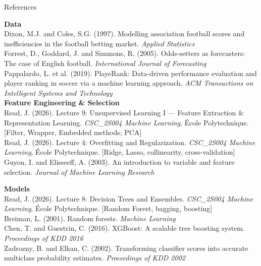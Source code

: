 \documentclass[aspectratio=169,12pt]{beamer}
\begin{document}
\begin{frame}[allowframebreaks]{References}
\tiny
\setlength{\parskip}{0.18em}

\textbf{Data}\\[0.15em]
Dixon, M.J. and Coles, S.G. (1997). Modelling association football scores and inefficiencies in the football betting market. \textit{Applied Statistics} \\
Forrest, D., Goddard, J. and Simmons, R. (2005). Odds-setters as forecasters: The case of English football. \textit{International Journal of Forecasting} \\
Pappalardo, L. et al. (2019). PlayeRank: Data-driven performance evaluation and player ranking in soccer via a machine learning approach. \textit{ACM Transactions on Intelligent Systems and Technology} \\

\vspace{3em}
\textbf{Feature Engineering \& Selection}\\[0.15em]
Read, J. (2026). Lecture 9: Unsupervised Learning I --- Feature Extraction \& Representation Learning. \textit{CSC\_2S004 Machine Learning}, École Polytechnique. [Filter, Wrapper, Embedded methods; PCA]\\
Read, J. (2026). Lecture 4: Overfitting and Regularization. \textit{CSC\_2S004 Machine Learning}, École Polytechnique. [Ridge, Lasso, collinearity, cross-validation]\\
Guyon, I. and Elisseeff, A. (2003). An introduction to variable and feature selection. \textit{Journal of Machine Learning Research}

\vspace{3em}
\textbf{Models}\\[0.15em]
Read, J. (2026). Lecture 8: Decision Trees and Ensembles. \textit{CSC\_2S004 Machine Learning}, École Polytechnique. [Random Forest, bagging, boosting]\\
Breiman, L. (2001). Random forests. \textit{Machine Learning} \\
Chen, T. and Guestrin, C. (2016). XGBoost: A scalable tree boosting system. \textit{Proceedings of KDD 2016} \\
Zadrozny, B. and Elkan, C. (2002). Transforming classifier scores into accurate multiclass probability estimates. \textit{Proceedings of KDD 2002} 

\end{frame}
\end{document}
